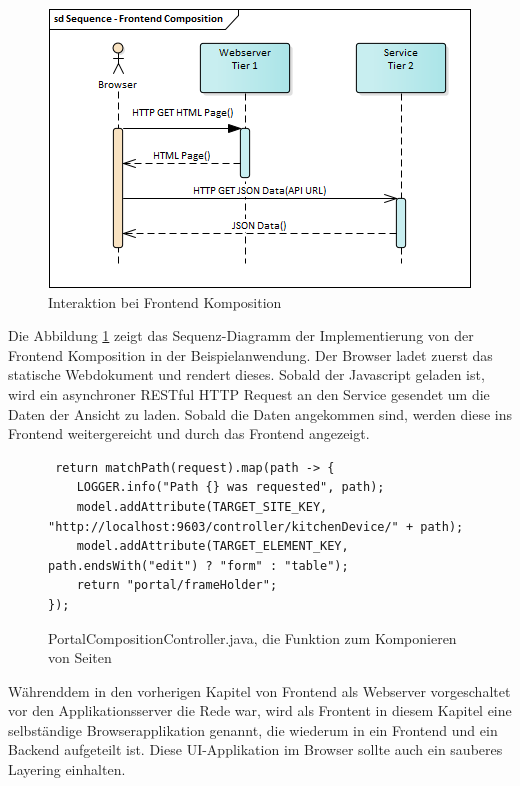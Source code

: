 \begin{figure}
    \centering
    \includegraphics[width=\textwidth]{sections/methology/assets/SequenceFrontendComposition}
    \caption{Interaktion bei Frontend Komposition}
    \label{fig:sections:methology:frontendComposition:Sequence}
\end{figure}

Die Abbildung  \ref{fig:sections:methology:frontendComposition:Sequence} zeigt das Sequenz-Diagramm der Implementierung von der Frontend Komposition in der Beispielanwendung. Der Browser ladet zuerst das statische Webdokument und rendert dieses. Sobald der Javascript geladen ist, wird ein asynchroner RESTful HTTP Request an den Service gesendet um die Daten der Ansicht zu laden. Sobald die Daten angekommen sind, werden diese ins Frontend weitergereicht und durch das Frontend angezeigt.

\begin{figure}
    \centering
\begin{lstlisting}
 return matchPath(request).map(path -> {
    LOGGER.info("Path {} was requested", path);
    model.addAttribute(TARGET_SITE_KEY, "http://localhost:9603/controller/kitchenDevice/" + path);
    model.addAttribute(TARGET_ELEMENT_KEY, path.endsWith("edit") ? "form" : "table");
    return "portal/frameHolder";
});
\end{lstlisting}
    \caption{PortalCompositionController.java, die Funktion zum Komponieren von Seiten}
    \label{fig:portalComposition:GETComposition}
\end{figure}

Währenddem  in den vorherigen Kapitel von Frontend als Webserver vorgeschaltet vor den Applikationsserver die Rede war, wird als Frontent in diesem Kapitel eine selbständige Browserapplikation genannt, die wiederum in ein Frontend und ein Backend aufgeteilt ist. Diese \ac{UI}-Applikation im Browser sollte auch ein sauberes Layering einhalten.


